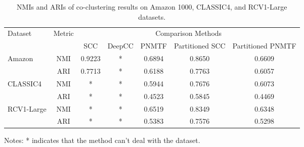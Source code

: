 \begin{table*}[htbp]
    \centering
    \caption{NMIs and ARIs of co-clustering results on Amazon 1000, CLASSIC4, and RCV1-Large datasets.}
    \label{tab:evaluation-metrics}
    \begin{tabular}{@{} l c ccccc @{}}
        \toprule
        \multirow{2}{*}{Dataset}    & \multirow{2}{*}{Metric} & \multicolumn{5}{c}{Comparison Methods}                                                         \\
        \cmidrule{3-7}
                                    &                         & SCC                                    & DeepCC & PNMTF  & Partitioned SCC & Partitioned PNMTF \\
        \midrule
        \multirow{2}{*}{Amazon}     & NMI                     & 0.9223                                 & *      & 0.6894 & 0.8650          & 0.6609            \\
                                    & ARI                     & 0.7713                                 & *      & 0.6188 & 0.7763          & 0.6057            \\
        \multirow{2}{*}{CLASSIC4}   & NMI                     & *                                      & *      & 0.5944 & 0.7676          & 0.6073            \\
                                    & ARI                     & *                                      & *      & 0.4523 & 0.5845          & 0.4469            \\
        \multirow{2}{*}{RCV1-Large} & NMI                     & *                                      & *      & 0.6519 & 0.8349          & 0.6348            \\
                                    & ARI                     & *                                      & *      & 0.5383 & 0.7576          & 0.5298            \\
        \bottomrule
    \end{tabular}
    \begin{tablenotes}
        \small
        \item Notes: * indicates that the method can't deal with the dataset.
    \end{tablenotes}
\end{table*}